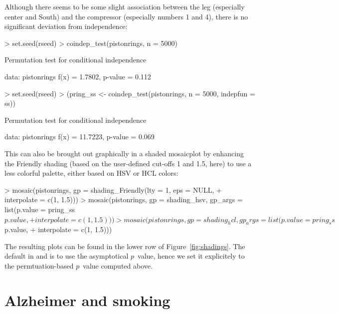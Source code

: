 \documentclass{Z}
\begin{document}
Although there seems to be some slight association between the leg (especially center and South)
and the compressor (especially numbers 1 and 4), there is no significant deviation from
independence:

\begin{Schunk}
\begin{Sinput}
> set.seed(rseed)
> coindep_test(pistonrings, n = 5000)
\end{Sinput}
\begin{Soutput}
	Permutation test for conditional independence

data:  pistonrings 
f(x) = 1.7802, p-value = 0.112
\end{Soutput}
\begin{Sinput}
> set.seed(rseed)
> (pring_ss <- coindep_test(pistonrings, n = 5000, indepfun = ss))
\end{Sinput}
\begin{Soutput}
	Permutation test for conditional independence

data:  pistonrings 
f(x) = 11.7223, p-value = 0.069
\end{Soutput}
\end{Schunk}

This can also be brought out graphically in a shaded mosaicplot by enhancing the Friendly
shading (based on the user-defined cut-offs 1 and 1.5, here) to use a less colorful palette,
either based on HSV or HCL colors:

\begin{Schunk}
\begin{Sinput}
> mosaic(pistonrings, gp = shading_Friendly(lty = 1, eps = NULL, 
+     interpolate = c(1, 1.5)))
> mosaic(pistonrings, gp = shading_hsv, gp_args = list(p.value = pring_ss$p.value, 
+     interpolate = c(1, 1.5)))
> mosaic(pistonrings, gp = shading_hcl, gp_args = list(p.value = pring_ss$p.value, 
+     interpolate = c(1, 1.5)))
\end{Sinput}
\end{Schunk}

The resulting plots can be found in the lower row of Figure~\ref{fig:shadings}. The default
in  and  is to use the asymptotical $p$~value, hence
we set it explicitely to the permtuation-based $p$~value computed above.



\section{Alzheimer and smoking} \label{sec:alzheimer}
\end{document}
